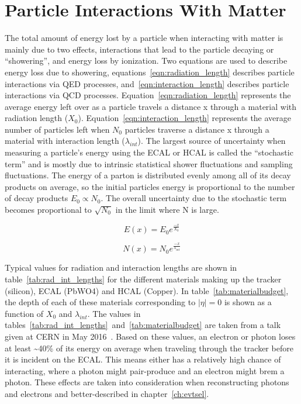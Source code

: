 \section{Particle Interactions With Matter}

The total amount of energy lost by a particle when interacting with matter is mainly due to two effects,
interactions that lead to the particle decaying or ``showering'',
and energy loss by ionization.
Two equations are used to describe energy loss due to showering,
equations~\ref{eqn:radiation_length} describes particle interactions via QED processes,
and~\ref{eqn:interaction_length} describes particle interactions via QCD processes.
Equation~\ref{eqn:radiation_length} represents the average energy left over as a particle travels a distance x through a material with radiation length ($X_{0}$).
Equation~\ref{eqn:interaction_length} represents the average number of particles left when $N_{0}$ particles traverse a distance x through a material with interaction length ($\lambda_{int}$).
The largest source of uncertainty when measuring a particle's energy using the ECAL or HCAL is called the ``stochastic term''
and is mostly due to intrinsic statistical shower fluctuations and sampling fluctuations.
The energy of a parton is distributed evenly among all of its decay products on average,
so the initial particles energy is proportional to the number of decay products $E_{0} \propto N_{0}$.
The overall uncertainty due to the stochastic term becomes proportional to $\sqrt{N_{0}}$ in the limit where N is large.

\begin{equation}
  \label{eqn:radiation_length}
  E(x) = E_{0}e^{\frac{-x}{X_{0}}}  
\end{equation}

\begin{equation}
  \label{eqn:interaction_length}
  N(x) = N_{0}e^{\frac{-x}{\lambda_{int}}}  
\end{equation}

Typical values for radiation and interaction lengths are shown in table~\ref{tab:rad_int_lengths}
for the different materials making up the tracker (silicon), ECAL (PbWO4) and HCAL (Copper).
In table~\ref{tab:materialbudget}, the depth of each of these materials corresponding to $|\eta| = 0$ is shown as a function of $X_{0}$ and $\lambda_{int}$.
The values in tables~\ref{tab:rad_int_lengths}~and~\ref{tab:materialbudget} are taken from a talk given at CERN in May 2016~\cite{calorimetry}.
Based on these values, an electron or photon loses at least \textasciitilde{}40\%
of its energy on average when traveling through the tracker before it is incident on the ECAL.
This means either has a relatively high chance of interacting, where a photon might pair-produce and an electron might brem a photon.
These effects are taken into consideration when reconstructing photons and electrons and better-described in chapter~\ref{ch:evtsel}.

